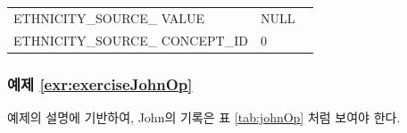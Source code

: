 \documentclass[11pt]{book}
\theoremstyle{definition}
\theoremstyle{definition}
\theoremstyle{definition}
\theoremstyle{remark}
\begin{document}
\begin{longtable}[]{@{}lll@{}}
\begin{minipage}[t]{0.28\columnwidth}
ETHNICITY\_SOURCE\_ VALUE\strut
\end{minipage} & \begin{minipage}[t]{0.16\columnwidth}\raggedright\strut
NULL\strut
\end{minipage} & \begin{minipage}[t]{0.48\columnwidth}\raggedright\strut
\strut
\end{minipage}\tabularnewline
\begin{minipage}[t]{0.28\columnwidth}\raggedright\strut
ETHNICITY\_SOURCE\_ CONCEPT\_ID\strut
\end{minipage} & \begin{minipage}[t]{0.16\columnwidth}\raggedright\strut
0\strut
\end{minipage} & \begin{minipage}[t]{0.48\columnwidth}\raggedright\strut
\strut
\end{minipage}\tabularnewline
\bottomrule
\end{longtable}

\subsubsection*{예제
\ref{exr:exerciseJohnOp}}\label{-refexrexercisejohnop}

예제의 설명에 기반하여, John의 기록은 표 \ref{tab:johnOp} 처럼 보여야
한다.
\end{document}
